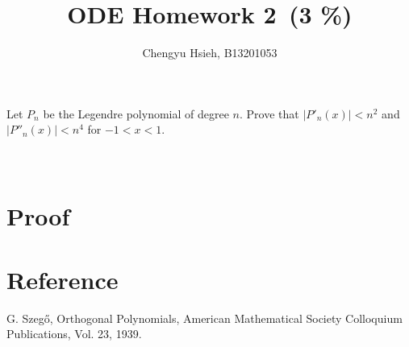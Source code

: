 \documentclass[A4paper,12pt]{article}
\title{ODE Homework 2\, (3 \%)}
\author{Chengyu Hsieh, B13201053}
\date{}
\theoremstyle{definition}
\numberwithin{equation}{section}
\begin{document}
\maketitle
Let \(P_n\) be the Legendre polynomial of degree \(n\). Prove that \(|
P'_n(x)|<n^2\) and \(|P''_n(x)|<n^4\) for \(-1<x<1\).\\
\\\\
\section*{Proof}

\section*{Reference}
G. Szegő, Orthogonal Polynomials, American Mathematical Society Colloquium Publications, Vol. 23, 1939.\\
\end{document}
